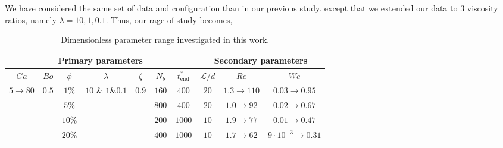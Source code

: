 We have considered the same set of data and configuration than in our previous study. 
except that we extended our data to $3$ viscosity ratios, namely $\lambda =10,1,0.1$.
Thus, our rage of study becomes, 
\begin{table}[h!]
    \centering
    \caption{Dimensionless parameter range investigated in this work.}
    \begin{tabular}{|ccccccc|ccc|}
        \hline
        \multicolumn{7}{|c}{Primary parameters} & \multicolumn{3}{||c|}{Secondary parameters}\\ \hline
        \multicolumn{1}{|c|}{$Ga$}                               & \multicolumn{1}{c|}{$Bo$}                   & \multicolumn{1}{c|}{$\phi$} & \multicolumn{1}{c|}{$\lambda$}                    & \multicolumn{1}{c|}{$\zeta$}                & \multicolumn{1}{c|}{$N_b$} & $t^*_\text{end}$ & \multicolumn{1}{||c|}{$\mathcal{L}/d$} & \multicolumn{1}{c|}{$Re$}  & $We$   \\ \hline
        \multicolumn{1}{|c|}{\multirow{4}{*}{$5\rightarrow 80$}} & \multicolumn{1}{c|}{\multirow{4}{*}{$0.5$}} & \multicolumn{1}{c|}{$1\%$}  & \multicolumn{1}{c|}{\multirow{4}{*}{$10$ \& $1$\&$0.1$}} & \multicolumn{1}{c|}{\multirow{4}{*}{$0.9$}} & \multicolumn{1}{c|}{$160$} & $400$           & \multicolumn{1}{||c|}{$20$}            & \multicolumn{1}{c|}{$1.3\to 110$} & {$0.03\to 0.95$} \\ 
        \multicolumn{1}{|c|}{}                                   & \multicolumn{1}{c|}{}                       & \multicolumn{1}{c|}{$5\%$}  & \multicolumn{1}{c|}{}                             & \multicolumn{1}{c|}{}                       & \multicolumn{1}{c|}{$800$} & $400$           & \multicolumn{1}{||c|}{$20$}            & \multicolumn{1}{c|}{$1.0\to 92$} &  {$0.02\to 0.67$}\\ 
        \multicolumn{1}{|c|}{}                                   & \multicolumn{1}{c|}{}                       & \multicolumn{1}{c|}{$10\%$} & \multicolumn{1}{c|}{}                             & \multicolumn{1}{c|}{}                       & \multicolumn{1}{c|}{$200$} & $1000$           & \multicolumn{1}{||c|}{$10$}            & \multicolumn{1}{c|}{$1.9\to 77$}&  {$0.01\to 0.47$}\\ 
        \multicolumn{1}{|c|}{}                                   & \multicolumn{1}{c|}{}                       & \multicolumn{1}{c|}{$20\%$} & \multicolumn{1}{c|}{}                             & \multicolumn{1}{c|}{}                       & \multicolumn{1}{c|}{$400$} & $1000$           & \multicolumn{1}{||c|}{$10$}            & \multicolumn{1}{c|}{$1.7\to 62$}&  {$9\cdot 10^{-3}\to 0.31$}\\ \hline
        \end{tabular}
\end{table}

